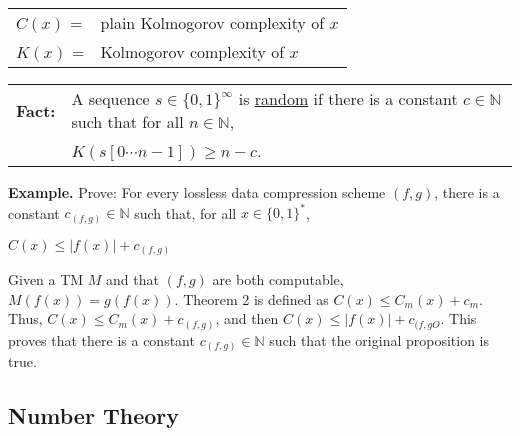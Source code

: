 \documentclass[11pt]{article}
\begin{document}
\begin{tabular}{ll}
$C(x)$ = & plain Kolmogorov complexity of $x$ \\
$K(x)$ = & Kolmogorov complexity of $x$ \\
\end{tabular}

\begin{tabular}{ll}
{\bf Fact:} & A sequence $s\in\{0,1\}^{\infty}$ is \underline{random} if there is a constant $c\in\mathbb{N}$ such that for all $n\in\mathbb{N}$, \\
& $K(s[0\cdots n-1]) \geqslant n - c$. \\ 
\end{tabular}

{\bf Example.} Prove: For every lossless data compression scheme $(f,g)$, there is a constant $c_{(f,g)}\in\mathbb{N}$ such that, for all $x\in\{0,1\}^*$,
\begin{center}
$C(x)\leqslant |f(x)|+c_{(f,g)}$
\end{center}
Given a TM $M$ and that $(f,g)$ are both computable, $M(f(x))=g(f(x))$. Theorem 2 is defined as $C(x) \leqslant C_m(x) + c_m$. Thus, $C(x)\leqslant C_m(x)+c_{(f,g)}$, and then $C(x) \leqslant |f(x)|+c_{(f,gO}$. This proves that there is a constant $c_{(f,g)}\in\mathbb{N}$ such that the original proposition is true. 

\subsection{Number Theory}
\end{document}
